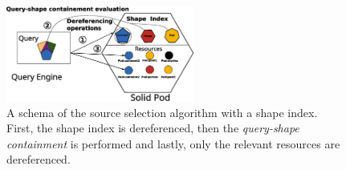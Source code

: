 \begin{figure}
    \centering
    \includegraphics[width=0.55\textwidth]{figure/shape_containement}
    \caption{A schema of the source selection algorithm with a shape index. First, the shape index is dereferenced, 
    then the \emph{query-shape containment} is performed and lastly, only the relevant resources are dereferenced.}
    \label{fig:shape_index}
\end{figure}
